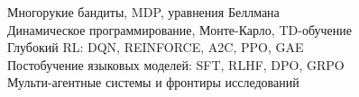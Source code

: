 \documentclass[oneside,openany]{book}
\theoremstyle{definition}
\theoremstyle{plain}
\theoremstyle{remark}
\begin{document}
\begin{titlepage}
\begin{flushleft}
    {\fontsize{9pt}{12pt}\selectfont
     \par}
    \vspace{8pt}

    {\fontsize{10.5pt}{17pt}\selectfont
     \noindent\textbullet\ Многорукие бандиты, MDP, уравнения Беллмана\\
     \textbullet\ Динамическое программирование, Монте-Карло, TD-обучение\\
     \textbullet\ Глубокий RL: DQN, REINFORCE, A2C, PPO, GAE\\
     \textbullet\ Постобучение языковых моделей: SFT, RLHF, DPO, GRPO\\
     \textbullet\ Мульти-агентные системы и фронтиры исследований\par}

    \vspace*{\fill}

    \noindent
    {\fontsize{8.5pt}{11pt}\selectfont
     \textbf{}\par}
    \vspace{2pt}
    {\fontsize{8pt}{11pt}\selectfont
     \par}
    \vspace{6pt}
    {\fontsize{8pt}{11pt}\selectfont
     \par}

  \end{flushleft}
  \restoregeometry
\end{titlepage}

\color{black}\rmfamily
\end{document}
